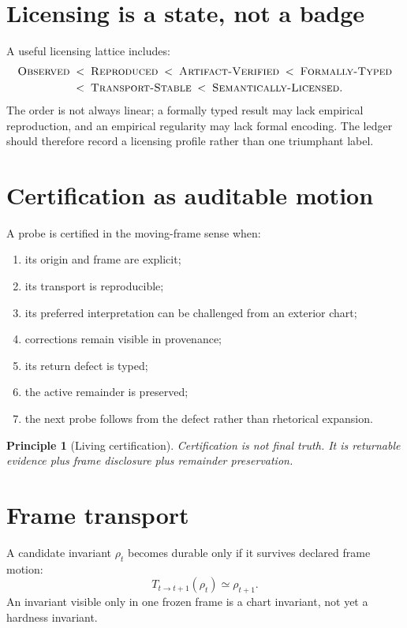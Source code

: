 \documentclass[12pt,openany]{book}
\newtheorem{principle}[definition]{Principle}
\theoremstyle{remark}
\begin{document}
\section{Licensing is a state, not a badge}
A useful licensing lattice includes:
\[
\begin{aligned}
\textsc{Observed}&\;<\;\textsc{Reproduced}\;<\;\textsc{Artifact-Verified}\;<\;\textsc{Formally-Typed}\\
&\;<\;\textsc{Transport-Stable}\;<\;\textsc{Semantically-Licensed}.
\end{aligned}
\]
The order is not always linear; a formally typed result may lack empirical reproduction, and an empirical regularity may lack formal encoding. The ledger should therefore record a licensing profile rather than one triumphant label.

\section{Certification as auditable motion}
A probe is certified in the moving-frame sense when:
\begin{enumerate}
\item its origin and frame are explicit;
\item its transport is reproducible;
\item its preferred interpretation can be challenged from an exterior chart;
\item corrections remain visible in provenance;
\item its return defect is typed;
\item the active remainder is preserved;
\item the next probe follows from the defect rather than rhetorical expansion.
\end{enumerate}

\begin{principle}[Living certification]
Certification is not final truth. It is returnable evidence plus frame disclosure plus remainder preservation.
\end{principle}

\section{Frame transport}
A candidate invariant $\rho_t$ becomes durable only if it survives declared frame motion:
\[
T_{t\to t+1}(\rho_t)\simeq\rho_{t+1}.
\]
An invariant visible only in one frozen frame is a chart invariant, not yet a hardness invariant.
\end{document}
